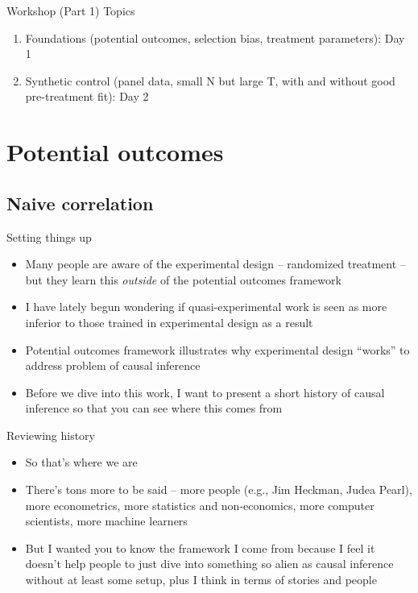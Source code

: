 \documentclass{beamer}
\begin{document}
\begin{frame}{Workshop (Part 1) Topics}

  \begin{enumerate}
    \item Foundations (potential outcomes, selection bias, treatment parameters): Day 1 
    \item Synthetic control (panel data, small N but large T, with and without good pre-treatment fit): Day 2
  \end{enumerate}

\end{frame}



\section{Potential outcomes}

\subsection{Naive correlation}


\begin{frame}{Setting things up}

\begin{itemize}
\item Many people are aware of the experimental design -- randomized treatment -- but they learn this \emph{outside} of the potential outcomes framework
\item I have lately begun wondering if quasi-experimental work is seen as more inferior to those trained in experimental design as a result
\item Potential outcomes framework illustrates why experimental design ``works'' to address problem of causal inference
\item Before we dive into this work, I want to present a short history of causal inference so that you can see where this comes from
\end{itemize}

\end{frame}

\begin{frame}{Reviewing history}

\begin{itemize}
\item So that's where we are
\item There's tons more to be said -- more people (e.g., Jim Heckman, Judea Pearl), more econometrics, more statistics and non-economics, more computer scientists, more machine learners
\item But I wanted you to know the framework I come from because I feel it doesn't help people to just dive into something so alien as causal inference without at least some setup, plus I think in terms of stories and people
\end{itemize}

\end{frame}
\end{document}
